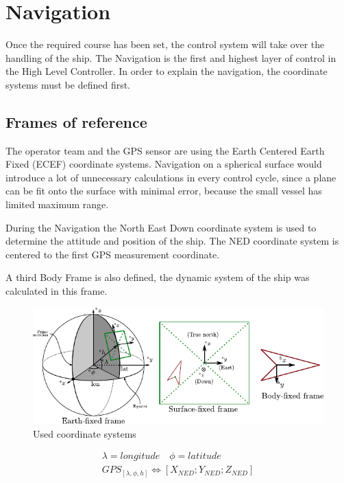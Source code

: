 \section{Navigation}

Once the required course has been set, the control system will take over the handling of the ship. The Navigation is the first and highest layer of control in the High Level Controller. In order to explain the navigation, the coordinate systems must be defined first.

\subsection{Frames of reference}

The operator team and the GPS sensor are using the Earth Centered Earth Fixed (ECEF) coordinate systems. Navigation on a spherical surface would introduce a lot of unnecessary calculations in every control cycle, since a plane can be fit onto the surface with minimal error, because the small vessel has limited maximum range.

During the Navigation the North East Down coordinate system is used to determine the attitude and position of the ship. The NED coordinate system is centered to the first GPS measurement coordinate.

A third Body Frame is also defined, the dynamic system of the ship was calculated in this frame.

\begin{figure}[H]
	\centering
	\includegraphics[width=\textwidth]{img/reference_frames}
	\caption{Used coordinate systems}
	\label{fig:coordinatesystem}
\end{figure}

\begin{align}
	\lambda = longitude  \quad \phi = latitude
	\\ GPS_{[\lambda , \phi , h]} \Longleftrightarrow [X_{NED}; Y_{NED}; Z_{NED}]
\end{align}

